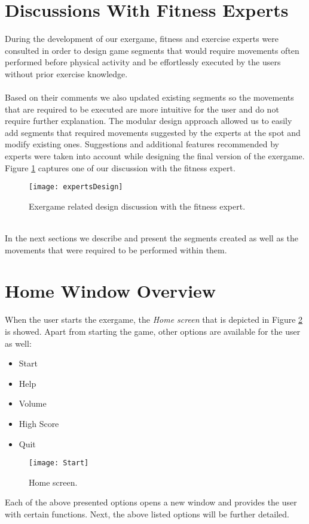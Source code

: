 \section{Discussions With Fitness Experts}
During the development of our exergame, fitness and exercise experts were consulted in order to design game segments that would require movements often performed before physical activity and be effortlessly executed by the users without prior exercise knowledge. \\\\Based on their comments we also updated existing segments so the movements that are required to be executed are more intuitive for the user and do not require further explanation. The modular design approach allowed us to easily add segments that required movements suggested by the experts at the spot and modify existing ones. Suggestions and additional features recommended by experts were taken into account while designing the final version of the exergame.  Figure \ref{fig:expDesign} captures one of our discussion with the fitness expert.\\  
 \begin{figure}[h]
    \centering
    \texttt{[image: expertsDesign]}
    \caption{Exergame related design discussion with the fitness expert.}
    \label{fig:expDesign}
\end{figure}\\
In the next sections we describe and present the segments created as well as the movements that were required to be performed within them.\pagebreak
\section{Home Window Overview}
When the user starts the exergame, the \textit{Home screen} that is depicted in Figure \ref{fig:start} is showed. Apart from starting the game, other options are available for the user as well:
\begin{itemize}
\item Start
\item Help
\item Volume
\item High Score
\item Quit
\end{itemize}
\begin{figure}[h]
    \centering
    \texttt{[image: Start]}
    \caption{Home screen.}
    \label{fig:start}
\end{figure}
Each of the above presented options opens a new window and provides the user with certain functions. Next, the above listed options will be further detailed.\pagebreak
